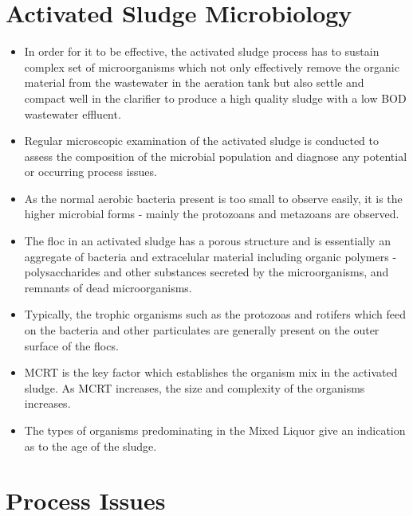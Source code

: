 \section{Activated Sludge Microbiology}

\begin{itemize}
\item In order for it to be effective, the activated sludge process has to sustain complex set of microorganisms which not only effectively remove the organic material from the wastewater in the aeration tank but also settle and compact well in the clarifier to produce a high quality sludge with a low BOD wastewater effluent.
\item Regular microscopic examination of the activated sludge is conducted to assess the composition of the microbial population and diagnose any potential or occurring process issues.  \item As the normal aerobic bacteria present is too small to observe easily, it is the higher microbial forms - mainly the protozoans and metazoans are observed.
\item The floc in an activated sludge has a porous structure and is essentially an aggregate of bacteria and extracelular material including organic polymers - polysaccharides and other substances secreted by the microorganisms, and remnants of dead microorganisms.
\item Typically, the trophic organisms such as the protozoas and rotifers which feed on the bacteria and other particulates are generally present on the outer surface of the flocs.
\item MCRT is the key factor which establishes the organism mix in the activated sludge.  As MCRT increases, the size and complexity of the organisms increases. 
\item The types of organisms predominating in the Mixed Liquor give an indication as to the age of the sludge.
\end{itemize}


\section{Process Issues}

